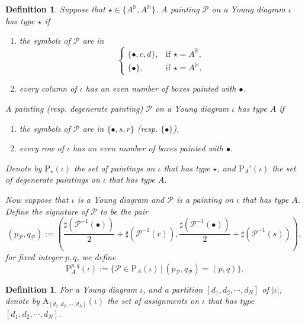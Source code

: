 \documentclass[12pt, a4paper]{amsart}
\numberwithin{equation}{section}
\newtheorem{defn}[thm]{Definition}
\newcommand{\BH}{{\mathbb {H}}}
\newcommand{\BR}{{\mathbb {R}}}
\newcommand{\CP}{{\mathcal {P}}}
\newcommand{\RA}{{\mathrm {A}}}
\newcommand{\set}[2]{\{#1\,|\,#2\}}
\begin{document}
\begin{defn}
   Suppose that $\star \in \{A^{\BR}, A^{\BH}\}$. A painting $\CP$ on a Young diagram $\iota$ has type $\star$ if
   \begin{enumerate}
      \item the symbols of $\CP$ are in
            $$\left\{
               \begin{array}{lr}
                  \{\bullet,c,d\}, & \textrm{if $\star = A^{\BR}$},\\                   \{\bullet\},     & \textrm{if $\star = A^{\BH}$},
               \end{array}
               \right.
            $$
      \item every column of $\iota$ has an even number of boxes painted with $\bullet$.
   \end{enumerate}

   A painting (resp. degenerate painting) $\CP$ on a Young diagram $\iota$ has type $A$ if
   \begin{enumerate}
      \item the symbols of $\CP$ are in $\{\bullet, s ,r\}$ (resp. $\{\bullet\}$),
      \item every row of $\iota$ has an even number of boxes painted with $\bullet$.
   \end{enumerate}

   Denote by $\mathrm{P}_{\star}(\iota)$ the set of paintings on $\iota$ that has type $\star$, and $\mathrm{P}_{A}'(\iota)$ the set of degenerate paintings on $\iota$ that has type $A$.

   Now suppose that $\iota$ is a Young diagram and $\CP$ is a painting on $\iota$ that has type $A$. Define the signature of $\CP$ to be the pair 
   \begin{equation}
    (p_{\CP}, q_{\CP}) := (\frac{\sharp(\CP^{-1}(\bullet))}{2} + \sharp(\CP^{-1}(r)), \frac{\sharp(\CP^{-1}(\bullet))}{2}+ \sharp(\CP^{-1}(s))),
   \end{equation}
   for fixed integer $p,q$, we define
   \begin{equation}
        \mathrm{P}_{A}^{p,q}(\iota) := \set{\CP \in \mathrm{P}_{A}(\iota)}{(p_{\CP},q_{\CP}) = (p,q)}.       
   \end{equation}
\end{defn}

\begin{defn}
   For a Young diagram $\iota$, and a partition $[d_1,d_2,\cdots,d_N]$ of $|\iota|$, denote by $\RA_{[d_1,d_2,\cdots,d_N]}(\iota)$ the set of assignments on $\iota$ that has type $[d_1,d_2,\cdots,d_N]$.
\end{defn}
\end{document}
